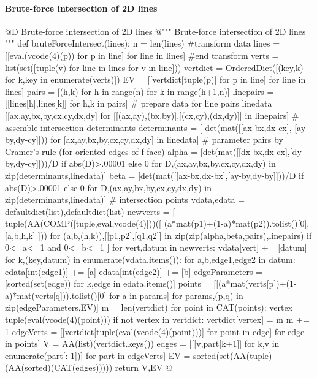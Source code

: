 \documentclass[11pt,oneside]{article}    %
\begin{document}
\paragraph{Brute-force intersection of 2D lines}
@D Brute-force intersection of 2D lines
@{""" Brute-force intersection of 2D lines """
def bruteForceIntersect(lines):
	n = len(lines)
	#transform data
	lines = [[eval(vcode(4)(p)) for p in line] for line in lines]
	#end transform
	verts = list(set([tuple(v) for line in lines for v in line]))
	vertdict = OrderedDict([(key,k) for k,key in enumerate(verts)])
	EV = [[vertdict[tuple(p)] for p in line] for line in lines]
	pairs = [(h,k) for h in range(n) for k in range(h+1,n)]
	linepairs = [[lines[h],lines[k]] for h,k in pairs]
	# prepare data for line pairs
	linedata = [[ax,ay,bx,by,cx,cy,dx,dy] 
		for [[(ax,ay),(bx,by)],[(cx,cy),(dx,dy)]] in linepairs]
	# assemble intersection determinants
	determinants = [ det(mat([[ax-bx,dx-cx], [ay-by,dy-cy]])) 
		for [ax,ay,bx,by,cx,cy,dx,dy] in linedata]
	# parameter pairs by Cramer's rule (for oriented edges of f face)
	alpha = [det(mat([[dx-bx,dx-cx],[dy-by,dy-cy]]))/D  if abs(D)>.00001 else 0 
		for D,(ax,ay,bx,by,cx,cy,dx,dy) in zip(determinants,linedata)]
	beta = [det(mat([[ax-bx,dx-bx],[ay-by,dy-by]]))/D  if abs(D)>.00001 else 0 
		for D,(ax,ay,bx,by,cx,cy,dx,dy) in zip(determinants,linedata)]
	# intersection points
	vdata,edata = defaultdict(list),defaultdict(list)
	newverts = [ tuple(AA(COMP([tuple,eval,vcode(4)]))([ 
		(a*mat(p1)+(1-a)*mat(p2)).tolist()[0], 
		[a,b,h,k] ]))
		for (a,b,(h,k)),[[p1,p2],[q1,q2]] in zip(zip(alpha,beta,pairs),linepairs) 
		if 0<=a<=1 and 0<=b<=1 ]
	for vert,datum in newverts:
	   vdata[vert] += [datum]
	for k,(key,datum) in enumerate(vdata.items()):
		for a,b,edge1,edge2 in datum:
			edata[int(edge1)] += [a]
			edata[int(edge2)] += [b]
	edgeParameters = [sorted(set(edge)) for k,edge in edata.items()]
	points = [[(a*mat(verts[p])+(1-a)*mat(verts[q])).tolist()[0] 
			for a in params] for params,(p,q) in zip(edgeParameters,EV)]
	m = len(vertdict)
	for point in CAT(points):
		vertex = tuple(eval(vcode(4)(point)))
		if not vertex in vertdict:
			vertdict[vertex] = m
			m += 1
	edgeVerts = [[vertdict[tuple(eval(vcode(4)(point)))] for point in edge] 
		for edge in points]
	V = AA(list)(vertdict.keys())
	edges = [[[v,part[k+1]] for k,v in enumerate(part[:-1])] for part in edgeVerts]
	EV = sorted(set(AA(tuple)(AA(sorted)(CAT(edges)))))
	return V,EV
@}
\end{document}
